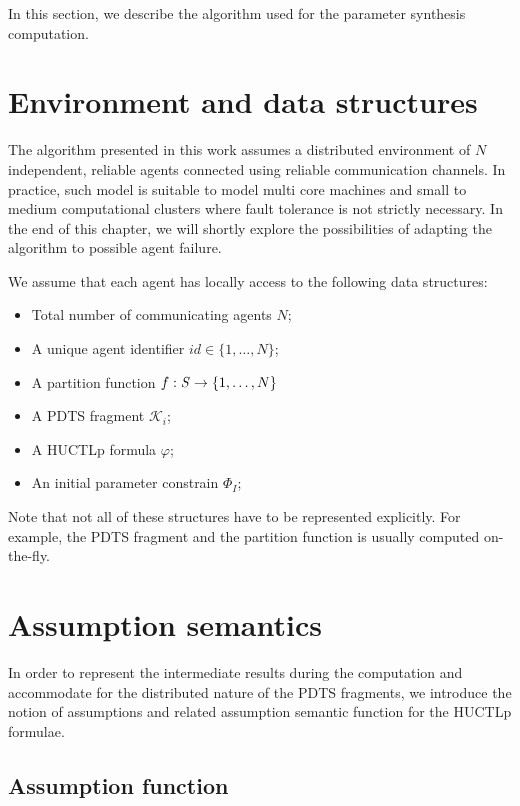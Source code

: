 In this section, we describe the algorithm used for the parameter synthesis computation.

\section{Environment and data structures}

The algorithm presented in this work assumes a distributed environment of $N$ independent, reliable agents connected using reliable communication channels. In practice, such model is suitable to model multi core machines and small to medium computational clusters where fault tolerance is not strictly necessary. In the end of this chapter, we will shortly explore the possibilities of adapting the algorithm to possible agent failure. 

We assume that each agent has locally access to the following data structures:

\begin{itemize}
	\item Total number of communicating agents $N$;
	\item A unique agent identifier $id \in \{ 1, \ldots, N \}$;
	\item A partition function $f : \mathit{S} \to \{1, \ldots, N \}$
	\item A \ac{PDTS} fragment $\mathcal{K}_i$;
	\item A \ac{HUCTLp} formula $\varphi$;
	\item An initial parameter constrain $\Phi_I$;
\end{itemize}

Note that not all of these structures have to be represented explicitly. For example, the \ac{PDTS} fragment and the partition function is usually computed on-the-fly.

\section{Assumption semantics}

In order to represent the intermediate results during the computation and accommodate for the distributed nature of the \ac{PDTS} fragments, we introduce the notion of assumptions and related assumption semantic function for the \ac{HUCTLp} formulae.

\subsection{Assumption function}

